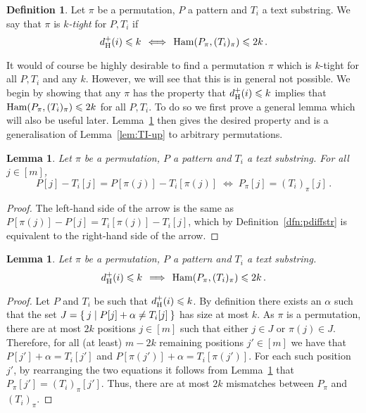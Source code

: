 \documentclass[11pt]{article}
\renewcommand{\leq}{\leqslant}
\newcommand{\ham}{\ensuremath{\textup{Ham}}}
\newcommand{\DsHam}{\ensuremath{d_\textup{H}^+}}
\newcommand{\dHam}{\DsHam}
\theoremstyle{plain}
\newtheorem{lemma}[theorem]{Lemma}
\theoremstyle{definition}
\newtheorem{definition}[theorem]{Definition}
\begin{document}
\begin{definition}
    \label{dfn:TI-ktight}
    Let $\pi$ be a permutation, $P$ a pattern and $T_i$ a text substring. We say that $\pi$ is \emph{$k$-tight} for $P,T_i$ if
\begin{equation*}
        \dHam(i)\leq k \,\iff\, \ham(P_\pi,(T_i)_{\pi}) \leq 2k\,.
    \end{equation*}
\end{definition}

It would of course be highly desirable to find a permutation $\pi$ which is $k$-tight for all $P,T_i$ and any $k$. However, we will see that this is in general not possible. 
We begin by showing that any $\pi$ has the property that $\dHam(i) \leq k$  implies that $\ham(P_\pi,(T_i)_{\pi}) \leq 2k$ for all $P,T_i$. To do so we first prove a general lemma which will also be useful later. Lemma~\ref{lem:TI-permup} then gives the desired property and is a generalisation of Lemma~\ref{lem:TI-up} to arbitrary permutations.

\begin{lemma}
    \label{lem:TI-kmisiff}
    Let $\pi$ be a permutation, $P$ a pattern and $T_i$ a text substring. For all $j\in [m]$,
\begin{equation*}
        P[j]-T_i[j] = P[\pi(j)]-T_i[\pi(j)]  \;\iff\; P_\pi[j] = (T_i)_\pi[j] \,.
    \end{equation*}
\end{lemma}
\begin{proof}
    The left-hand side of the arrow is the same as $P[\pi(j)]-P[j] = T_i[\pi(j)]-T_i[j]$, which by Definition~\ref{dfn:pdiffstr} is equivalent to the right-hand side of the arrow.
\end{proof}


\begin{lemma}
    \label{lem:TI-permup}
    Let $\pi$ be a permutation, $P$ a pattern and $T_i$ a text substring.
\begin{equation*}
       \dHam(i)\leq k \,\implies\, \ham(P_\pi,(T_i)_{\pi}) \leq 2k \,.
    \end{equation*}
\end{lemma}
\begin{proof}
    Let $P$ and $T_i$ be such that $\dHam(i)\leq k$. By definition there exists an $\alpha$ such that the set $J=\Set{ j | P[j]+\alpha \neq T_i[j] }$ has size at most $k$. As $\pi$ is a permutation, there are at most $2k$ positions $j\in [m]$ such that either $j\in J$ or $\pi(j)\in J$. Therefore, for all (at least) $m-2k$ remaining positions $j'\in [m]$ we have that $P[j']+\alpha=T_i[j']$ and $P[\pi(j')]+\alpha=T_i[\pi(j')]$. For each such position $j'$, by rearranging the two equations it follows from Lemma~\ref{lem:TI-kmisiff} that $P_\pi[j'] = (T_i)_\pi[j']$. Thus, there are at most $2k$ mismatches between $P_\pi$ and $(T_i)_{\pi}$.
\end{proof}
\end{document}
